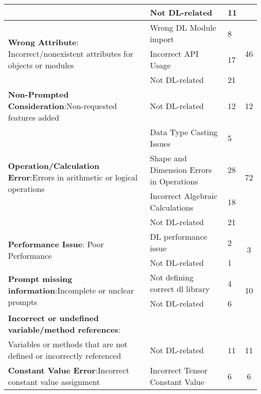 \begin{table*}[h!]
{\begin{tabular}{lllc}
 &
  Not DL-related&
  11&
   \\ \hline
\multirow{3}{*}{\textbf{Wrong Attribute}: Incorrect/nonexistent attributes for objects or modules}& Wrong DL Module import& 8& \multirow{3}{*}{46}  \\
 &
  Incorrect API Usage &
  17 &
   \\
 &
  Not DL-related&
  21&
   \\ \hline
\textbf{Non-Prompted Consideration}:Non-requested features added&
  Not DL-related &
  12 &
  12 \\ \hline
\multirow{4}{*}{\textbf{Operation/Calculation Error}:Errors in arithmetic or logical operations} &
  Data Type Casting Issues&
  5&
  \multirow{4}{*}{72} \\
 &
  Shape and Dimension Errors in Operations &
  28 &
   \\
 &
  Incorrect Algebraic Calculations &
  18 &
   \\
 &
  Not DL-related&
  21&
   \\ \hline
   \multirow{2}{*}{\textbf{Performance Issue}: Poor Performance} &
  DL performance issue&
  2&
  \multirow{2}{*}{3} \\
 &
  Not DL-related&
  1&
   \\ \hline
\multirow{2}{*}{\textbf{Prompt missing information}:Incomplete or unclear prompts} &
  Not defining correct dl library&
  4&
  \multirow{2}{*}{10} \\
 &
  Not DL-related&
  6&
   \\ \hline
\textbf{Incorrect or undefined variable/method references}:\\Variables or methods that are not defined or incorrectly referenced&
  Not DL-related &
  11 &
  11 \\ \hline
\textbf{Constant Value Error}:Incorrect constant value assignment &
  Incorrect Tensor Constant Value &
  6 &
  6 \\ \hline

\end{tabular}
}
\end{table*}